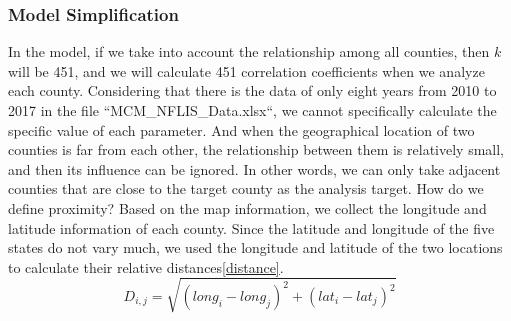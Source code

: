 \documentclass{mcmthesis}
\begin{document}
\subsubsection{Model Simplification}
In the model, if we take into account the relationship among all counties, then $k$ will be 451, and we will calculate 451 correlation coefficients when we analyze each county. Considering that there is the data of only eight years from 2010 to 2017 in the file ``MCM\_NFLIS\_Data.xlsx``, we cannot specifically calculate the specific value of each parameter. And when the geographical location of two counties is far from each other, the relationship between them is relatively small, and then its influence can be ignored. In other words, we can only take adjacent counties that are close to the target county as the analysis target. How do we define proximity? Based on the map information, we collect the longitude and latitude information of each county. Since the latitude and longitude of the five states do not vary much, we used the longitude and latitude of the two locations to calculate their relative distances\eqref{distance}.
\begin{equation}
D_{i,j} = \sqrt{(long_i-long_j)^2+(lat_i-lat_j)^2}
\label{distance}
\end{equation}
\end{document}
